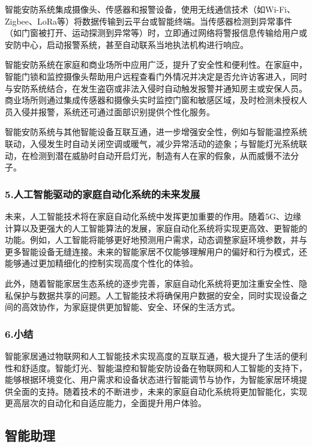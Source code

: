 智能安防系统集成摄像头、传感器和报警设备，使用无线通信技术（如Wi-Fi、Zigbee、LoRa等）将数据传输到云平台或智能终端。当传感器检测到异常事件（如门窗被打开、运动探测到异常等）时，立即通过网络将警报信息传输给用户或安防中心，启动报警系统，甚至自动联系当地执法机构进行响应。

智能安防系统在家庭和商业场所中应用广泛，提升了安全性和便利性。在家庭中，智能门锁和监控摄像头帮助用户远程查看门外情况并决定是否允许访客进入，同时与安防系统结合，在发生盗窃或非法入侵时自动触发报警并通知房主或安保人员。
商业场所则通过集成传感器和摄像头实时监控门窗和敏感区域，及时检测未授权人员入侵并报警，系统还可通过面部识别提供个性化服务。

智能安防系统与其他智能设备互联互通，进一步增强安全性，例如与智能温控系统联动，入侵发生时自动关闭空调或暖气，减少异常活动的迹象；与智能灯光系统联动，在检测到潜在威胁时自动开启灯光，制造有人在家的假象，从而威慑不法分子。

\subsubsection{5.人工智能驱动的家庭自动化系统的未来发展}

未来，人工智能技术将在家庭自动化系统中发挥更加重要的作用。随着5G、边缘计算以及更强大的人工智能算法的发展，家庭自动化系统将实现更高效、更智能的功能。例如，人工智能将能够更好地预测用户需求，动态调整家庭环境参数，并与更多智能设备无缝连接。未来的智能家居不仅能够理解用户的偏好和行为模式，还能够通过更加精细化的控制实现高度个性化的体验。

此外，随着智能家居生态系统的逐步完善，家庭自动化系统将更加注重安全性、隐私保护与数据共享的问题。人工智能技术将确保用户数据的安全，同时实现设备之间的高效协作，为家庭提供更加智能、安全、环保的生活方式。

\subsubsection{6.小结}

智能家居通过物联网和人工智能技术实现高度的互联互通，极大提升了生活的便利性和舒适度。智能灯光、智能温控和智能安防设备在物联网和人工智能的支持下，能够根据环境变化、用户需求和设备状态进行智能调节与协作，为智能家居环境提供全面的支持。随着技术的不断进步，未来的家庭自动化系统将更加智能化，实现更高层次的自动化和自适应能力，全面提升用户体验。

\subsection{智能助理}


